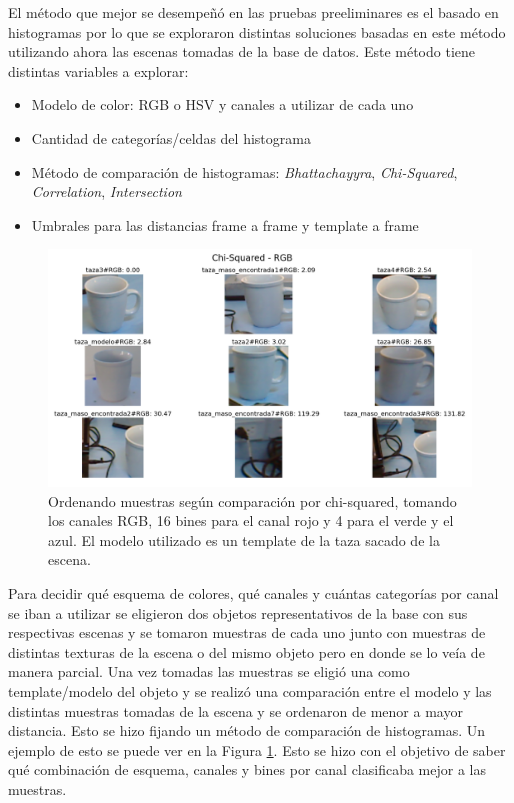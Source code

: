 El método que mejor se desempeñó en las pruebas preeliminares es el basado en histogramas por lo que se exploraron distintas soluciones basadas en este método utilizando ahora las escenas tomadas de la base de datos. Este método tiene distintas variables a explorar:
\begin{itemize}
	\item Modelo de color: RGB o HSV y canales a utilizar de cada uno
	\item Cantidad de categorías/celdas del histograma
	\item Método de comparación de histogramas: \textit{Bhattachayyra}, \textit{Chi-Squared}, \textit{Correlation}, \textit{Intersection}
	\item Umbrales para las distancias frame a frame y template a frame
\end{itemize}


\begin{figure}
	\centering
	\includegraphics[width=\textwidth]{img/results_chi-squared_rgb_16r_4g_4b.png}
	\caption{Ordenando muestras según comparación por chi-squared, tomando los canales RGB, 16 bines para el canal rojo y 4 para el verde y el azul. El modelo utilizado es un template de la taza sacado de la escena.}
	\label{pruebas_eleccion_canales}
\end{figure}

Para decidir qué esquema de colores, qué canales y cuántas categorías por canal se iban a utilizar se eligieron dos objetos representativos de la base con sus respectivas escenas y se tomaron muestras de cada uno junto con muestras de distintas texturas de la escena o del mismo objeto pero en donde se lo veía de manera parcial. Una vez tomadas las muestras se eligió una como template/modelo del objeto y se realizó una comparación entre el modelo y las distintas muestras tomadas de la escena y se ordenaron de menor a mayor distancia. Esto se hizo fijando un método de comparación de histogramas. Un ejemplo de esto se puede ver en la Figura \ref{pruebas_eleccion_canales}. Esto se hizo con el objetivo de saber qué combinación de esquema, canales y bines por canal clasificaba mejor a las muestras.


